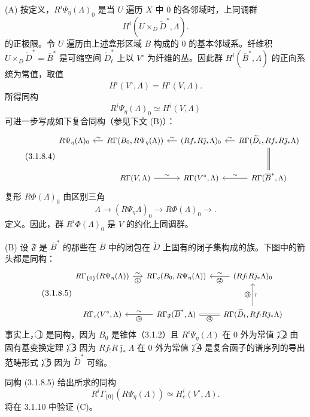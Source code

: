 \medskip
\noindent\textup{(A)}
按定义，$R^i\Psi_\eta(\Lambda)_0$ 是当 $U$ 遍历 $X$ 中 $0$ 的各邻域时，上同调群
\[
H^i(U\times_D\widetilde D^*,\Lambda).
\]
的正极限。令 $U$ 遍历由上述盒形区域 $B$ 构成的 $0$ 的基本邻域系。纤维积 $U\times_D\widetilde D^*=\overline B^*$ 是可缩空间 $\widetilde D_t^*$ 上以 $V^\circ$ 为纤维的丛。因此群 $H^i(\overline B^*,\Lambda)$ 的正向系统为常值，取值
\[
H^i(V^\circ,\Lambda)=H^i(V,\Lambda).
\]
所得同构
\begin{equation}\tag{3.1.8.3}
R^i\Psi_\eta(\Lambda)_0\simeq H^i(V,\Lambda)
\end{equation}
可进一步写成如下复合同构（参见下文 (B)）：
\begin{equation}\tag{3.1.8.4}
\begin{tikzcd}[column sep=small,row sep=large,cells={nodes={font=\small}}]
R\Psi_\eta(\Lambda)_0
  & R\Gamma(B_0,R\Psi_\eta(\Lambda)) \arrow[l,"\sim"']
  & (Rf_*R\bar\jmath_*\Lambda)_0 \arrow[l,"\sim"']
  & R\Gamma(\widetilde D_t,Rf_*R\bar\jmath_*\Lambda)
      \arrow[l,"\sim"'] \arrow[d,equal] \\
{}
  & R\Gamma(V,\Lambda) \arrow[r,"\sim"]
  & R\Gamma(V^\circ,\Lambda)
  & R\Gamma(\overline B^*,\Lambda) \arrow[l,"\sim"']
\end{tikzcd}
\end{equation}
复形 $R\Phi(\Lambda)_0$ 由区别三角
\[
\Lambda\longrightarrow(R\Psi_\eta\Lambda)_0
\longrightarrow R\Phi(\Lambda)_0\longrightarrow{}.
\]
定义。因此，群 $R^i\Phi(\Lambda)_0$ 是 $V$ 的约化上同调群。

\medskip
\noindent\textup{(B)}
设 $\mathfrak F$ 是 $\overline B^*$ 的那些在 $\overline B$ 中的闭包在 $\widetilde D$ 上固有的闭子集构成的族。下图中的箭头都是同构：
\begin{equation}\tag{3.1.8.5}
\begin{tikzcd}[column sep=small,row sep=large,cells={nodes={font=\small}}]
R\Gamma_{\{0\}}(R\Psi_\eta(\Lambda))
  \arrow[r,"\sim","\text{\textcircled{1}}"']
  & R\Gamma_c(B_0,R\Psi_\eta(\Lambda))
  & (Rf_!R\bar\jmath_*\Lambda)_0
      \arrow[l,"\sim"',"\text{\textcircled{2}}"] \\
R\Gamma_c(V^\circ,\Lambda)
  & R\Gamma_{\mathfrak F}(\overline B^*,\Lambda)
      \arrow[l,"\sim"',"\text{\textcircled{5}}"]
      \arrow[r,equal,"\text{\textcircled{4}}"']
  & R\Gamma(\widetilde D_t,Rf_!R\bar\jmath_*\Lambda)
      \arrow[u,"\text{\textcircled{3}}","\wr"']
\end{tikzcd}
\end{equation}
事实上，\textcircled{1} 是同构，因为 $B_0$ 是锥体（3.1.2）且 $R^i\Psi_\eta(\Lambda)$ 在 $0$ 外为常值；\textcircled{2} 由固有基变换定理；\textcircled{3} 因为 $Rf_!R\bar\jmath_*\Lambda$ 在 $0$ 外为常值；\textcircled{4} 是复合函子的谱序列的导出范畴形式；\textcircled{5} 因为 $\widetilde D^*$ 可缩。

同构 (3.1.8.5) 给出所求的同构
\begin{equation}\tag{3.1.8.6}
R^i\Gamma_{\{0\}}(R\Psi_\eta(\Lambda))
\simeq H_c^i(V^\circ,\Lambda).
\end{equation}
将在 3.1.10 中验证 (C)。

